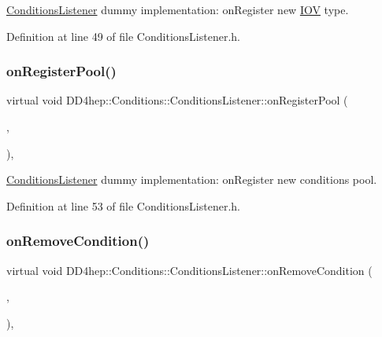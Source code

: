 \hyperlink{class_d_d4hep_1_1_conditions_1_1_conditions_listener}{Conditions\+Listener} dummy implementation\+: on\+Register new \hyperlink{class_d_d4hep_1_1_i_o_v}{I\+OV} type. 



Definition at line 49 of file Conditions\+Listener.\+h.

\hypertarget{class_d_d4hep_1_1_conditions_1_1_conditions_listener_a161a768eb8f00b3272d85f95ec14fa86}{}\label{class_d_d4hep_1_1_conditions_1_1_conditions_listener_a161a768eb8f00b3272d85f95ec14fa86} 
\subsubsection{\texorpdfstring{on\+Register\+Pool()}{onRegisterPool()}}
{\footnotesize\ttfamily virtual void D\+D4hep\+::\+Conditions\+::\+Conditions\+Listener\+::on\+Register\+Pool (\begin{DoxyParamCaption}\item[{\hyperlink{class_d_d4hep_1_1_conditions_1_1_conditions_pool}{Conditions\+Pool} $\ast$}]{,  }\item[{void $\ast$}]{ }\end{DoxyParamCaption})\hspace{0.3cm}{\ttfamily [inline]}, {\ttfamily [virtual]}}



\hyperlink{class_d_d4hep_1_1_conditions_1_1_conditions_listener}{Conditions\+Listener} dummy implementation\+: on\+Register new conditions pool. 



Definition at line 53 of file Conditions\+Listener.\+h.

\hypertarget{class_d_d4hep_1_1_conditions_1_1_conditions_listener_ab0c021c6ef8e6c47f28dd077220ee1f3}{}\label{class_d_d4hep_1_1_conditions_1_1_conditions_listener_ab0c021c6ef8e6c47f28dd077220ee1f3} 
\subsubsection{\texorpdfstring{on\+Remove\+Condition()}{onRemoveCondition()}}
{\footnotesize\ttfamily virtual void D\+D4hep\+::\+Conditions\+::\+Conditions\+Listener\+::on\+Remove\+Condition (\begin{DoxyParamCaption}\item[{\hyperlink{class_d_d4hep_1_1_conditions_1_1_condition}{Condition}}]{,  }\item[{void $\ast$}]{ }\end{DoxyParamCaption})\hspace{0.3cm}{\ttfamily [inline]}, {\ttfamily [virtual]}}



